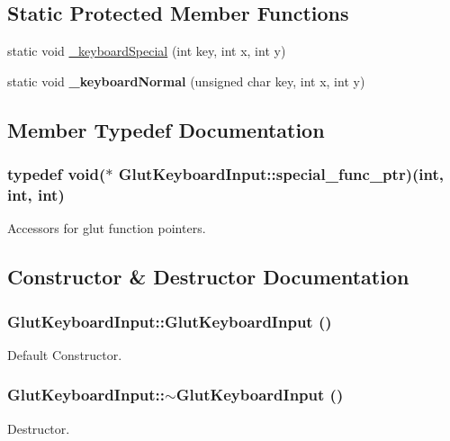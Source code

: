 \subsection*{Static Protected Member Functions}
\begin{DoxyCompactItemize}
\item 
static void \hyperlink{class_glut_keyboard_input_ad76b2ea4c7f06c3a20f3a7f950869d3d}{\_\-keyboardSpecial} (int key, int x, int y)
\item 
\hypertarget{class_glut_keyboard_input_a972e8d68734dcc5010430ce5b2e67beb}{
static void {\bfseries \_\-keyboardNormal} (unsigned char key, int x, int y)}
\label{class_glut_keyboard_input_a972e8d68734dcc5010430ce5b2e67beb}

\end{DoxyCompactItemize}


\subsection{Member Typedef Documentation}
\hypertarget{class_glut_keyboard_input_aec1d7be46aca658f1fc7303e32ff4b62}{
\subsubsection[{special\_\-func\_\-ptr}]{\setlength{\rightskip}{0pt plus 5cm}typedef void($\ast$ {\bf GlutKeyboardInput::special\_\-func\_\-ptr})(int, int, int)}}
\label{class_glut_keyboard_input_aec1d7be46aca658f1fc7303e32ff4b62}
Accessors for glut function pointers. 

\subsection{Constructor \& Destructor Documentation}
\hypertarget{class_glut_keyboard_input_a68f755baae4426cb2004686918499d0a}{
\subsubsection[{GlutKeyboardInput}]{\setlength{\rightskip}{0pt plus 5cm}GlutKeyboardInput::GlutKeyboardInput ()}}
\label{class_glut_keyboard_input_a68f755baae4426cb2004686918499d0a}
Default Constructor. \hypertarget{class_glut_keyboard_input_ada68b75e8cf17723f1515fb7b996622e}{
\subsubsection[{$\sim$GlutKeyboardInput}]{\setlength{\rightskip}{0pt plus 5cm}GlutKeyboardInput::$\sim$GlutKeyboardInput ()}}
\label{class_glut_keyboard_input_ada68b75e8cf17723f1515fb7b996622e}
Destructor. 

